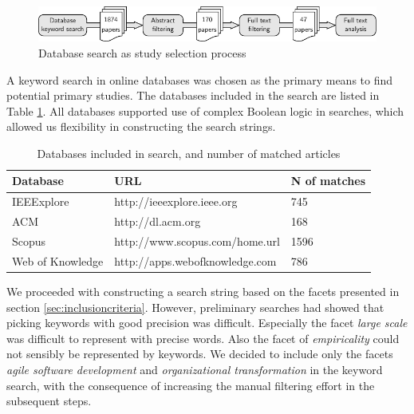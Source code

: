 \documentclass[preprint,authoryear,12pt]{elsarticle}
\begin{document}
\begin{figure}
  \begin{center}
    \includegraphics[width=1\textwidth]{graphics/research_process.pdf}
    \caption{Database search as study selection process}
    \label{fig:selectionprocess}
  \end{center}
\end{figure}

A keyword search in online databases was chosen as the primary means to find
potential primary studies. The databases included in the search are listed in
Table \ref{table:databases}. All databases supported use of complex Boolean
logic in searches, which allowed us flexibility in constructing the search
strings.

\begin{table}
    \centering
    \begin{tabular}{ l l l }
        \toprule
        Database         & URL                         & N of matches   \\
        \midrule
        IEEExplore       & http://ieeexplore.ieee.org      & 745 \\ 
        ACM              & http://dl.acm.org               & 168 \\
        Scopus           & http://www.scopus.com/home.url  & 1596 \\
        Web of Knowledge & http://apps.webofknowledge.com  & 786 \\
        \bottomrule
    \end{tabular}
    \caption{Databases included in search, and number of matched articles}
    \label{table:databases}
\end{table}

We proceeded with constructing a search string based on the facets presented in
section \ref{sec:inclusioncriteria}. However, preliminary searches had showed
that picking keywords with good precision was difficult. Especially the facet
\emph{large scale} was difficult to represent with precise words. Also the facet
of \emph{empiricality} could not sensibly be represented by keywords. We decided
to include only the facets \emph{agile software development} and
\emph{organizational transformation} in the keyword search, with the consequence
of increasing the manual filtering effort in the subsequent steps.
\end{document}
